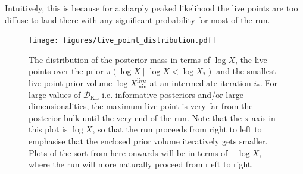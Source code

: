 \documentclass[usenatbib]{mnras}
\newcommand{\DKL}{\mathcal{D}_\mathrm{KL}}
\begin{document}
\par
Intuitively, this is because for a sharply peaked likelihood the live points are too diffuse to land there with any significant probability for most of the run.
\begin{figure}
\begin{center}
	\texttt{[image: figures/live\_point\_distribution.pdf]}
\end{center}
\caption{The distribution of the posterior mass in terms of $\log X$, the live points over the prior $\pi(\log X \mid \log X < \log X_*)$ and the smallest live point prior volume $\log X_\mathrm{min}^{\mathrm{live}}$ at an intermediate iteration $i_*$. For large values of $\DKL$ i.e. informative posteriors and/or large dimensionalities, the maximum live point is very far from the posterior bulk until the very end of the run. Note that the x-axis in this plot is $\log X$, so that the run proceeds from right to left to emphasise that the enclosed prior volume iteratively gets smaller. Plots of the sort from here onwards will be in terms of $-\log X$, where the run will more naturally proceed from rleft to right.}
\label{fig:live_point_distribution}
\end{figure}
\end{document}
